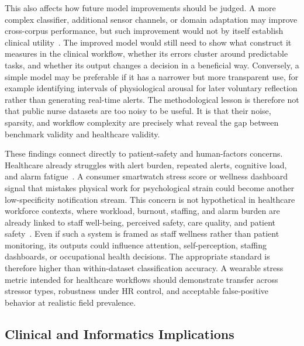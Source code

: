 \documentclass[healthcare,article,submit,moreauthors,pdftex]{Definitions/mdpi}
\begin{document}
This also affects how future model improvements should be judged. A more complex
classifier, additional sensor channels, or domain adaptation may improve
cross-corpus performance, but such improvement would not by itself establish
clinical utility~\cite{vickers2006decisioncurve,vancalster2019calibration}. The
improved model would still need to show what construct it measures in the
clinical workflow, whether its errors cluster around predictable tasks, and
whether its output changes a decision in a beneficial way.
Conversely, a simple model may be preferable if it has a narrower but more
transparent use, for example identifying intervals of physiological arousal for
later voluntary reflection rather than generating real-time alerts. The
methodological lesson is therefore not that public nurse datasets are too noisy
to be useful. It is that their noise, sparsity, and workflow complexity are
precisely what reveal the gap between benchmark validity and healthcare
validity.

These findings connect directly to patient-safety and human-factors concerns.
Healthcare already struggles with alert burden, repeated alerts, cognitive load,
and alarm fatigue~\cite{ancker2017alertfatigue,lewandowska2020alarmfatigue,
ruppel2023alarmburden,gulsen2025alarmfatigue}. A consumer smartwatch stress
score or wellness dashboard signal that mistakes physical work for psychological
strain could become another low-specificity notification stream. This concern is
not hypothetical in healthcare workforce contexts, where workload, burnout,
staffing, and alarm burden are already linked to staff well-being, perceived
safety, care quality, and patient
safety~\cite{dallora2020burnout,hall2016staffwellbeing,ruppel2023alarmburden,
gulsen2025alarmfatigue}.
Even if such a system is framed as staff wellness rather than patient monitoring,
its outputs could influence attention, self-perception, staffing dashboards, or
occupational health decisions. The appropriate standard is therefore higher than
within-dataset classification accuracy. A wearable stress metric intended for
healthcare workflows should demonstrate transfer across stressor types,
robustness under HR control, and acceptable false-positive behavior at realistic
field prevalence.

\subsection{Clinical and Informatics Implications}
\end{document}
